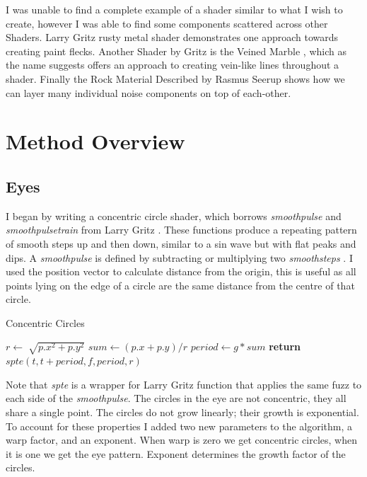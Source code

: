 \documentclass[]{acmsiggraph}
\begin{document}
I was unable to find a complete example of a shader similar to what I wish to create, however I was able to find some components scattered across other Shaders. Larry Gritz rusty metal shader\cite{rust} demonstrates one approach towards creating paint flecks. Another Shader by Gritz is the Veined Marble \cite{marble}, which as the name suggests offers an approach to creating vein-like lines throughout a shader. Finally the Rock Material Described by Rasmus Seerup \cite{Rock} shows how we can layer many individual noise components on top of each-other. 

\section{Method Overview} \label{sec:overview}
\subsection{Eyes}
I began by writing a concentric circle shader, which borrows \textit{smoothpulse} and \textit{smoothpulsetrain} from Larry Gritz \cite{larrygritzarman}. These functions produce a repeating pattern of smooth steps up and then down, similar to a sin wave but with flat peaks and dips. A \textit{smoothpulse} is defined by subtracting or multiplying two \textit{smoothsteps} \cite{fundza}. I used the position vector to calculate distance from the origin, this is useful as all points lying on the edge of a circle are the same distance from the centre of that circle.
\begin{algorithm}
\caption{Concentric Circles}\label{alg:concircles}
\begin{algorithmic}[1]
\State $r\gets \sqrt[]{p.x^2 + p.y^2}$
\State $sum\gets (p.x + p.y)/r$
\State $period \gets g * sum$
\State \textbf{return} $spte(t, t + period, f, period, r)$
\EndProcedure
\end{algorithmic}
\end{algorithm}
\newline 
Note that \textit{spte} is a wrapper for Larry Gritz function that applies the same fuzz to each side of the \textit{smoothpulse}. The circles in the eye are not concentric, they all share a single point. The circles do not grow linearly; their growth is exponential. To account for these properties I added two new parameters to the algorithm, a warp factor, and an exponent. When warp is zero we get concentric circles, when it is one we get the eye pattern. Exponent determines the growth factor of the circles.
\end{document}
